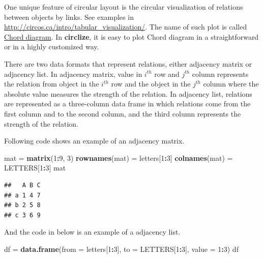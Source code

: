 \documentclass[]{book}
\newenvironment{Shaded}{\begin{snugshade}}{\end{snugshade}}
\newcommand{\KeywordTok}[1]{\textcolor[rgb]{0.13,0.29,0.53}{\textbf{#1}}}
\newcommand{\DataTypeTok}[1]{\textcolor[rgb]{0.13,0.29,0.53}{#1}}
\newcommand{\DecValTok}[1]{\textcolor[rgb]{0.00,0.00,0.81}{#1}}
\newcommand{\StringTok}[1]{\textcolor[rgb]{0.31,0.60,0.02}{#1}}
\newcommand{\OperatorTok}[1]{\textcolor[rgb]{0.81,0.36,0.00}{\textbf{#1}}}
\newcommand{\NormalTok}[1]{#1}
\theoremstyle{definition}
\theoremstyle{definition}
\theoremstyle{remark}
\begin{document}
One unique feature of circular layout is the circular visualization of
relations between objects by links. See examples in
\url{http://circos.ca/intro/tabular_visualization/}. The name of such
plot is called \href{http://en.wikipedia.org/wiki/Chord_diagram}{Chord
diagram}. In \textbf{circlize}, it is easy to plot Chord diagram in a
straightforward or in a highly customized way.

There are two data formats that represent relations, either adjacency
matrix or adjacency list. In adjacency matrix, value in \(i^{th}\) row
and \(j^{th}\) column represents the relation from object in the
\(i^{th}\) row and the object in the \(j^{th}\) column where the
absolute value measures the strength of the relation. In adjacency list,
relations are represented as a three-column data frame in which
relations come from the first column and to the second column, and the
third column represents the strength of the relation.

Following code shows an example of an adjacency matrix.

\begin{Shaded}
\begin{Highlighting}[]
\NormalTok{mat =}\StringTok{ }\KeywordTok{matrix}\NormalTok{(}\DecValTok{1}\OperatorTok{:}\DecValTok{9}\NormalTok{, }\DecValTok{3}\NormalTok{)}
\KeywordTok{rownames}\NormalTok{(mat) =}\StringTok{ }\NormalTok{letters[}\DecValTok{1}\OperatorTok{:}\DecValTok{3}\NormalTok{]}
\KeywordTok{colnames}\NormalTok{(mat) =}\StringTok{ }\NormalTok{LETTERS[}\DecValTok{1}\OperatorTok{:}\DecValTok{3}\NormalTok{]}
\NormalTok{mat}
\end{Highlighting}
\end{Shaded}

\begin{verbatim}
##   A B C
## a 1 4 7
## b 2 5 8
## c 3 6 9
\end{verbatim}

And the code in below is an example of a adjacency list.

\begin{Shaded}
\begin{Highlighting}[]
\NormalTok{df =}\StringTok{ }\KeywordTok{data.frame}\NormalTok{(}\DataTypeTok{from =}\NormalTok{ letters[}\DecValTok{1}\OperatorTok{:}\DecValTok{3}\NormalTok{], }\DataTypeTok{to =}\NormalTok{ LETTERS[}\DecValTok{1}\OperatorTok{:}\DecValTok{3}\NormalTok{], }\DataTypeTok{value =} \DecValTok{1}\OperatorTok{:}\DecValTok{3}\NormalTok{)}
\NormalTok{df}
\end{Highlighting}
\end{Shaded}
\end{document}
